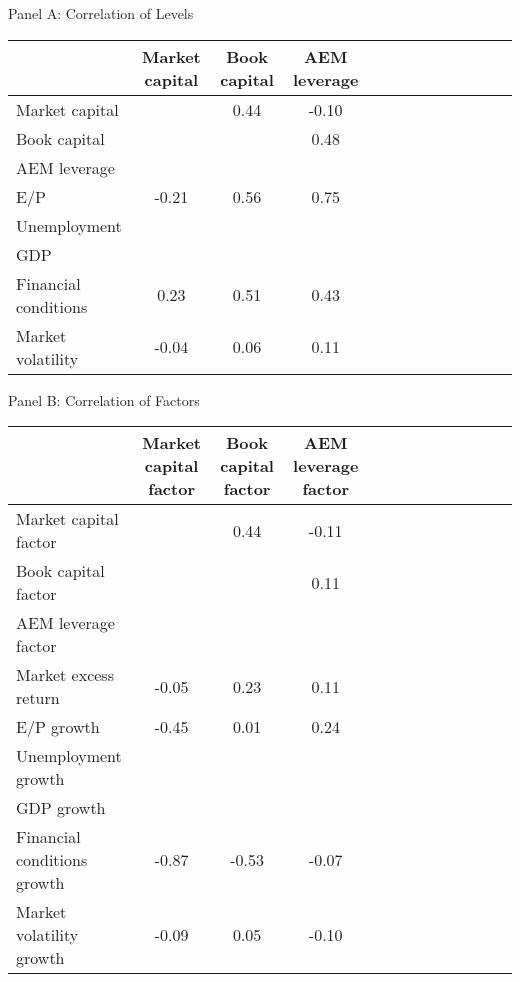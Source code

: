 \documentclass{article}
\begin{document}
    \begin{table}[htbp]
      \centering
      \begin{adjustbox}{max width=\textwidth}
      \small
      Panel A: Correlation of Levels \\
      \begin{tabular}{lcccccccccccc}
\toprule
 & Market capital & Book capital & AEM leverage \\
\midrule
Market capital &  & 0.44 & -0.10 \\
Book capital &  &  & 0.48 \\
AEM leverage &  &  &  \\
E/P & -0.21 & 0.56 & 0.75 \\
Unemployment &  &  &  \\
GDP &  &  &  \\
Financial conditions & 0.23 & 0.51 & 0.43 \\
Market volatility & -0.04 & 0.06 & 0.11 \\
\bottomrule
\end{tabular}
      \vspace{2em} 
      Panel B: Correlation of Factors \\
      \begin{tabular}{lcccccccccccc}
\toprule
 & Market capital factor & Book capital factor & AEM leverage factor \\
\midrule
Market capital factor &  & 0.44 & -0.11 \\
Book capital factor &  &  & 0.11 \\
AEM leverage factor &  &  &  \\
Market excess return & -0.05 & 0.23 & 0.11 \\
E/P growth & -0.45 & 0.01 & 0.24 \\
Unemployment growth &  &  &  \\
GDP growth &  &  &  \\
Financial conditions growth & -0.87 & -0.53 & -0.07 \\
Market volatility growth & -0.09 & 0.05 & -0.10 \\
\bottomrule
\end{tabular}
      \end{adjustbox}
    \end{table}
    
\end{document}
